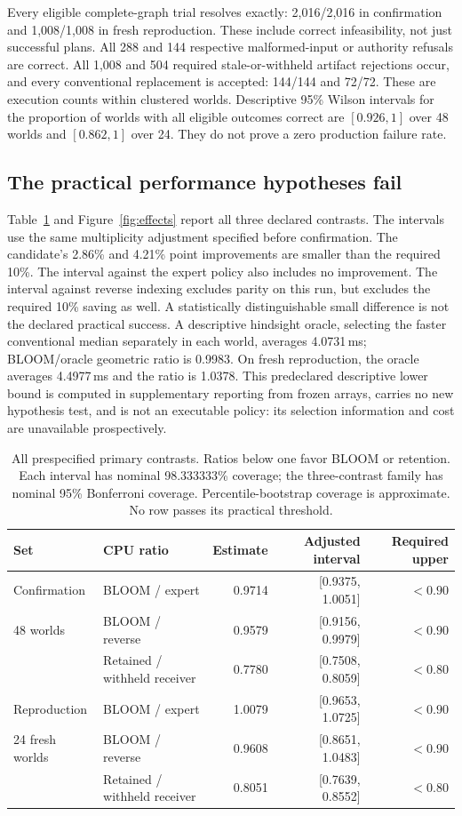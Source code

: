 Every eligible complete-graph trial resolves exactly: 2,016/2,016 in confirmation and 1,008/1,008 in fresh reproduction. These include correct infeasibility, not just successful plans. All 288 and 144 respective malformed-input or authority refusals are correct. All 1,008 and 504 required stale-or-withheld artifact rejections occur, and every conventional replacement is accepted: 144/144 and 72/72. These are execution counts within clustered worlds. Descriptive 95\% Wilson intervals for the proportion of worlds with all eligible outcomes correct are $[0.926,1]$ over 48 worlds and $[0.862,1]$ over 24. They do not prove a zero production failure rate.

\subsection{The practical performance hypotheses fail}
Table~\ref{tab:effects} and Figure~\ref{fig:effects} report all three declared contrasts. The intervals use the same multiplicity adjustment specified before confirmation. The candidate's 2.86\% and 4.21\% point improvements are smaller than the required 10\%. The interval against the expert policy also includes no improvement. The interval against reverse indexing excludes parity on this run, but excludes the required 10\% saving as well. A statistically distinguishable small difference is not the declared practical success. A descriptive hindsight oracle, selecting the faster conventional median separately in each world, averages 4.0731\,ms; BLOOM/oracle geometric ratio is 0.9983. On fresh reproduction, the oracle averages 4.4977\,ms and the ratio is 1.0378. This predeclared descriptive lower bound is computed in supplementary reporting from frozen arrays, carries no new hypothesis test, and is not an executable policy: its selection information and cost are unavailable prospectively.

\begin{table}[htbp]
\centering\small
\begin{tabular}{@{}llrrr@{}}
\toprule
Set & CPU ratio & Estimate & Adjusted interval & Required upper \\
\midrule
Confirmation & BLOOM / expert & 0.9714 & [0.9375, 1.0051] & $<0.90$ \\
48 worlds & BLOOM / reverse & 0.9579 & [0.9156, 0.9979] & $<0.90$ \\
 & Retained / withheld receiver & 0.7780 & [0.7508, 0.8059] & $<0.80$ \\
\addlinespace
Reproduction & BLOOM / expert & 1.0079 & [0.9653, 1.0725] & $<0.90$ \\
24 fresh worlds & BLOOM / reverse & 0.9608 & [0.8651, 1.0483] & $<0.90$ \\
 & Retained / withheld receiver & 0.8051 & [0.7639, 0.8552] & $<0.80$ \\
\bottomrule
\end{tabular}
\caption{All prespecified primary contrasts. Ratios below one favor BLOOM or retention. Each interval has nominal 98.333333\% coverage; the three-contrast family has nominal 95\% Bonferroni coverage. Percentile-bootstrap coverage is approximate. No row passes its practical threshold.}
\label{tab:effects}
\end{table}

